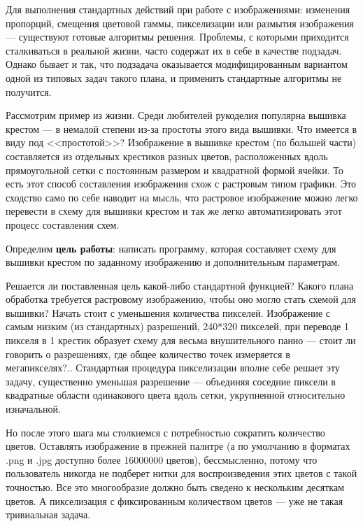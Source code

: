 \documentclass[12pt]{article}
\begin{document}
	{\parskip=6pt
	
	Для выполнения стандартных действий при работе с изображениями: изменения пропорций, смещения цветовой гаммы, пикселизации или размытия изображения — существуют готовые алгоритмы решения. Проблемы, с которыми приходится сталкиваться в реальной жизни, часто содержат их в себе в качестве подзадач. Однако бывает и так, что подзадача оказывается модифицированным вариантом одной из типовых задач такого плана, и применить стандартные алгоритмы не получится. 
	
	Рассмотрим пример из жизни. Среди любителей рукоделия популярна вышивка крестом — в немалой степени из-за простоты этого вида вышивки. Что имеется в виду под <<простотой>>? Изображение в вышивке крестом (по большей части) составляется из отдельных крестиков разных цветов, расположенных вдоль прямоугольной сетки с постоянным размером и квадратной формой ячейки. То есть этот способ составления изображения схож с растровым типом графики. Это сходство само по себе наводит на мысль, что растровое изображение можно легко перевести в схему для вышивки крестом и так же легко автоматизировать этот процесс составления схем. 
	
	Определим {\bf цель работы}: написать программу, которая составляет схему для вышивки крестом по заданному изображению и дополнительным параметрам. 
	
	Решается ли поставленная цель какой-либо стандартной функцией? Какого плана обработка требуется растровому изображению, чтобы оно могло стать схемой для вышивки? Начать стоит с уменьшения количества пикселей. Изображение с самым низким (из стандартных) разрешений, 240*320 пикселей, при переводе 1 пикселя в 1 крестик образует схему для весьма внушительного панно — стоит ли говорить о разрешениях, где общее количество точек измеряется в мегапикселях?.. Стандартная процедура пикселизации вполне себе решает эту задачу, существенно уменьшая разрешение — объединяя соседние пиксели в квадратные области одинакового цвета вдоль сетки, укрупненной относительно изначальной.
	
	Но после этого шага мы столкнемся с потребностью сократить количество цветов. Оставлять изображение в прежней палитре (а по умолчанию в форматах .png и .jpg доступно более 16000000 цветов), бессмысленно, потому что пользователь никогда не подберет нитки для воспроизведения этих цветов с такой точностью. Все это многообразие должно быть сведено к нескольким десяткам цветов. А пикселизация с фиксированным количеством цветов — уже не такая тривиальная задача.
	
}
\end{document}

